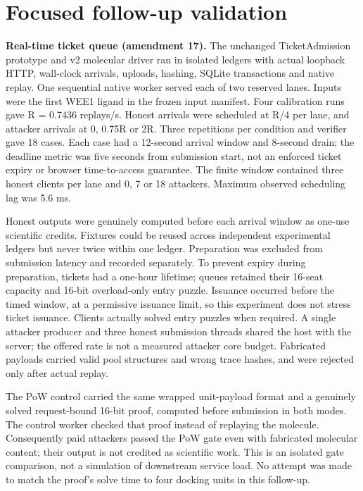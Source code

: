\documentclass[11pt]{article}
\begin{document}
\section{Focused follow-up validation}

\textbf{Real-time ticket queue (amendment 17).} The unchanged TicketAdmission prototype and v2 molecular driver ran in isolated ledgers with actual loopback HTTP, wall-clock arrivals, uploads, hashing, SQLite transactions and native replay. One sequential native worker served each of two reserved lanes. Inputs were the first WEE1 ligand in the frozen input manifest. Four calibration runs gave R = 0.7436 replays/s. Honest arrivals were scheduled at R/4 per lane, and attacker arrivals at 0, 0.75R or 2R. Three repetitions per condition and verifier gave 18 cases. Each case had a 12-second arrival window and 8-second drain; the deadline metric was five seconds from submission start, not an enforced ticket expiry or browser time-to-access guarantee. The finite window contained three honest clients per lane and 0, 7 or 18 attackers. Maximum observed scheduling lag was 5.6 ms.

Honest outputs were genuinely computed before each arrival window as one-use scientific credits. Fixtures could be reused across independent experimental ledgers but never twice within one ledger. Preparation was excluded from submission latency and recorded separately. To prevent expiry during preparation, tickets had a one-hour lifetime; queues retained their 16-seat capacity and 16-bit overload-only entry puzzle. Issuance occurred before the timed window, at a permissive issuance limit, so this experiment does not stress ticket issuance. Clients actually solved entry puzzles when required. A single attacker producer and three honest submission threads shared the host with the server; the offered rate is not a measured attacker core budget. Fabricated payloads carried valid pool structures and wrong trace hashes, and were rejected only after actual replay.

The PoW control carried the same wrapped unit-payload format and a genuinely solved request-bound 16-bit proof, computed before submission in both modes. The control worker checked that proof instead of replaying the molecule. Consequently paid attackers passed the PoW gate even with fabricated molecular content; their output is not credited as scientific work. This is an isolated gate comparison, not a simulation of downstream service load. No attempt was made to match the proof's solve time to four docking units in this follow-up.
\end{document}
